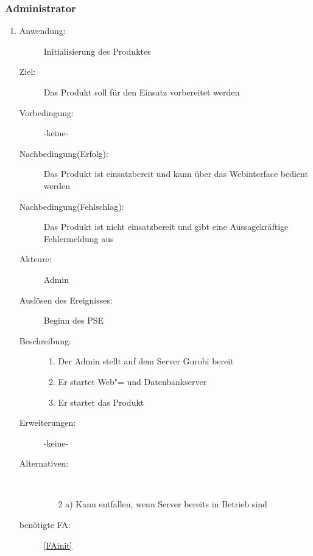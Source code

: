 \documentclass[parskip=full]{scrartcl}
\newcommand{\swtLabel}[1]{\textbf{/#1\arabic*0/}}
\begin{document}
\subsubsection{Administrator}
\begin{enumerate} [label=\swtLabel{A}]
	
	\item
	\begin{description}
		\item[Anwendung:] Initialisierung des Produktes
		\item[Ziel:] Das Produkt soll für den Einsatz vorbereitet werden
		\item[Vorbedingung:] -keine-
		\item[Nachbedingung(Erfolg):] Das Produkt ist einsatzbereit und kann über das Webinterface bedient werden
		\item[Nachbedingung(Fehlschlag):] Das Produkt ist nicht einsatzbereit und gibt eine Aussagekräftige Fehlermeldung aus
		\item[Akteure:] \gls{Admin}
		\item[Auslösen des Ereignisses:] Beginn des \gls{PSE}
		\item[Beschreibung:]
		\begin{enumerate} [label=\arabic*.]~
			\item Der \gls{Admin} stellt auf dem Server Gurobi bereit %
			\item Er startet Web"= und Datenbankserver
			\item Er startet das Produkt
		\end{enumerate}
		\item[Erweiterungen:] -keine-
		\item[Alternativen:]~
		\begin{enumerate}
			\item[2 a)] Kann entfallen, wenn Server bereits in Betrieb sind
		\end{enumerate}
		\item[benötigte FA:] \ref{FAinit}
	\end{description}
	

\end{enumerate}
\end{document}

